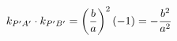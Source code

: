 \documentclass[preview]{standalone}
\begin{document}
\begin{align*}
\special{dvisvgm:raw <g id='unique000'>}k_{P'A'}\cdot k_{P'B'}=\left(\frac{b}{a}\right)^2(-1)=-\frac{b^2}{a^2}\special{dvisvgm:raw </g>}
\end{align*}
\end{document}
